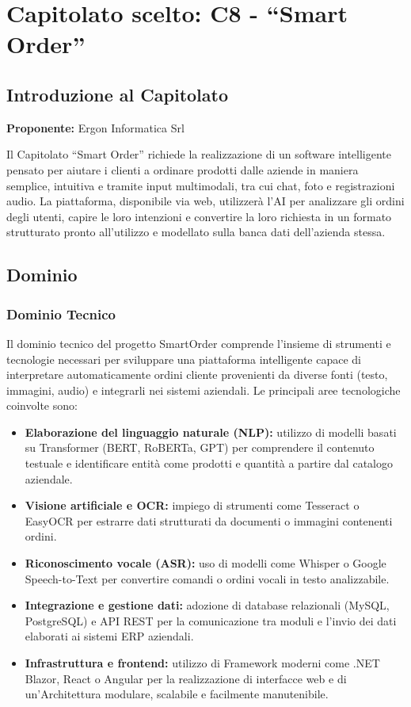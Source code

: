 \documentclass[a4paper,12pt]{article}
\begin{document}
\section{Capitolato scelto: C8 - ``Smart Order''}

\subsection{Introduzione al Capitolato}
\textbf{Proponente:} Ergon Informatica Srl

Il Capitolato ``Smart Order'' richiede la realizzazione di un software intelligente pensato per aiutare i clienti a ordinare prodotti dalle aziende in maniera semplice, intuitiva e tramite input multimodali, tra cui chat, foto e registrazioni audio. La piattaforma, disponibile via web, utilizzerà l’AI per analizzare gli ordini degli utenti, capire le loro intenzioni e convertire la loro richiesta in un formato strutturato pronto all’utilizzo e modellato sulla banca dati dell’azienda stessa.

\subsection{Dominio}

\subsubsection{Dominio Tecnico}
Il dominio tecnico del progetto SmartOrder comprende l’insieme di strumenti e tecnologie necessari per sviluppare una piattaforma intelligente capace di interpretare automaticamente ordini cliente provenienti da diverse fonti (testo, immagini, audio) e integrarli nei sistemi aziendali. Le principali aree tecnologiche coinvolte sono:

\begin{itemize}
    \item \textbf{Elaborazione del linguaggio naturale (NLP):} utilizzo di modelli basati su Transformer (BERT, RoBERTa, GPT) per comprendere il contenuto testuale e identificare entità come prodotti e quantità a partire dal catalogo aziendale.
    \item \textbf{Visione artificiale e OCR:} impiego di strumenti come Tesseract o EasyOCR per estrarre dati strutturati da documenti o immagini contenenti ordini.
    \item \textbf{Riconoscimento vocale (ASR):} uso di modelli come Whisper o Google Speech-to-Text per convertire comandi o ordini vocali in testo analizzabile.
    \item \textbf{Integrazione e gestione dati:} adozione di database relazionali (MySQL, PostgreSQL) e API REST per la comunicazione tra moduli e l’invio dei dati elaborati ai sistemi ERP aziendali.
    \item \textbf{Infrastruttura e frontend:} utilizzo di Framework moderni come .NET Blazor, React o Angular per la realizzazione di interfacce web e di un’Architettura modulare, scalabile e facilmente manutenibile.
\end{itemize}
\end{document}
